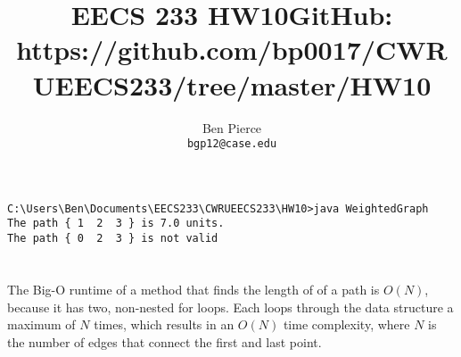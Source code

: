 \documentclass[12pt]{article} %
\title{EECS 233 HW10}
\author{Ben Pierce \\ \texttt{bgp12@case.edu}}
\begin{document}
\maketitle
\title {GitHub: https://github.com/bp0017/CWRUEECS233/tree/master/HW10} 

\section{}
\begin{lstlisting}
C:\Users\Ben\Documents\EECS233\CWRUEECS233\HW10>java WeightedGraph
The path { 1  2  3 } is 7.0 units.
The path { 0  2  3 } is not valid
\end{lstlisting}
\section{}
The Big-O runtime of a method that finds the length of of a path is $O(N)$, because it has two, non-nested for loops. Each loops through the data structure a maximum of $N$ times, which results in an $O(N)$ time complexity, where $N$ is the number of edges that connect the first and last point.
\section{}
\end{document}
